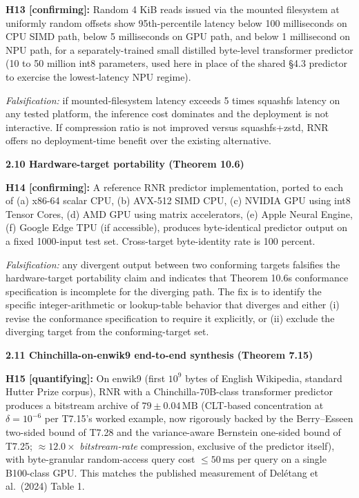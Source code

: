\documentclass[
]{article}
\begin{document}
\textbf{H13 {[}confirming{]}:} Random 4 KiB reads issued via the mounted
filesystem at uniformly random offsets show 95th-percentile latency
below 100 milliseconds on CPU SIMD path, below 5 milliseconds on GPU
path, and below 1 millisecond on NPU path, for a separately-trained
small distilled byte-level transformer predictor (10 to 50 million
int8 parameters, used here in place of the shared §4.3 predictor to
exercise the lowest-latency NPU regime).

\emph{Falsification:} if mounted-filesystem latency exceeds 5 times
squashfs latency on any tested platform, the inference cost dominates
and the deployment is not interactive. If compression ratio is not
improved versus squashfs+zstd, RNR offers no deployment-time benefit
over the existing alternative.

\textbf{2.10 Hardware-target portability (Theorem 10.6)}

\textbf{H14 {[}confirming{]}:} A reference RNR predictor implementation,
ported to each of (a) x86-64 scalar CPU, (b) AVX-512 SIMD CPU, (c)
NVIDIA GPU using int8 Tensor Cores, (d) AMD GPU using matrix
accelerators, (e) Apple Neural Engine, (f) Google Edge TPU (if
accessible), produces byte-identical predictor output on a fixed
1000-input test set. Cross-target byte-identity rate is 100 percent.

\emph{Falsification:} any divergent output between two conforming
targets falsifies the hardware-target portability claim and indicates
that Theorem 10.6\textquotesingle s conformance specification is
incomplete for the diverging path. The fix is to identify the specific
integer-arithmetic or lookup-table behavior that diverges and either (i)
revise the conformance specification to require it explicitly, or (ii)
exclude the diverging target from the conforming-target set.

\textbf{2.11 Chinchilla-on-enwik9 end-to-end synthesis (Theorem 7.15)}

\textbf{H15 {[}quantifying{]}:} On enwik9 (first $10^9$ bytes of
English Wikipedia, standard Hutter Prize corpus), RNR with a
Chinchilla-70B-class transformer predictor produces a bitstream
archive of $79 \pm 0.04\,\mathrm{MB}$ (CLT-based concentration at
$\delta = 10^{-6}$ per T7.15's worked example, now rigorously backed
by the Berry--Esseen two-sided bound of T7.28 and the variance-aware
Bernstein one-sided bound of T7.25; $\approx 12.0\times$
\emph{bitstream-rate} compression, exclusive of the predictor
itself), with byte-granular random-access query cost
$\leq 50\,\mathrm{ms}$ per query on a single B100-class GPU. This
matches the published measurement of Delétang et al.\ (2024) Table 1.
\end{document}
